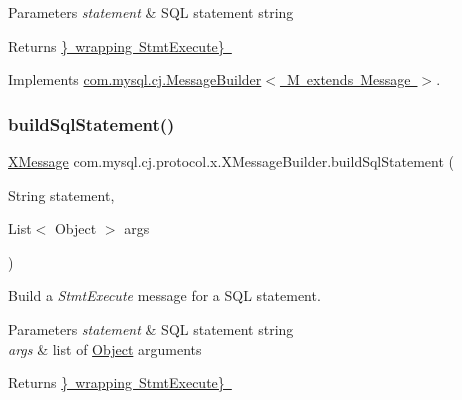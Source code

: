 \begin{DoxyParams}{Parameters}
{\em statement} & S\+QL statement string \\
\hline
\end{DoxyParams}
\begin{DoxyReturn}{Returns}
\mbox{\hyperlink{classcom_1_1mysql_1_1cj_1_1protocol_1_1x_1_1_x_message}{\} wrapping  Stmt\+Execute\} }}
\end{DoxyReturn}


Implements \mbox{\hyperlink{interfacecom_1_1mysql_1_1cj_1_1_message_builder_ab18c136ad40edd22c321cae8c222e6ad}{com.\+mysql.\+cj.\+Message\+Builder$<$ M extends Message $>$}}.

\mbox{\label{classcom_1_1mysql_1_1cj_1_1protocol_1_1x_1_1_x_message_builder_a2c3993eeb6a20211b7a81f15784fb537}} 
\subsubsection{\texorpdfstring{build\+Sql\+Statement()}{buildSqlStatement()}\hspace{0.1cm}{\footnotesize\ttfamily [2/2]}}
{\footnotesize\ttfamily \mbox{\hyperlink{classcom_1_1mysql_1_1cj_1_1protocol_1_1x_1_1_x_message}{X\+Message}} com.\+mysql.\+cj.\+protocol.\+x.\+X\+Message\+Builder.\+build\+Sql\+Statement (\begin{DoxyParamCaption}\item[{String}]{statement,  }\item[{List$<$ Object $>$}]{args }\end{DoxyParamCaption})}

Build a {\itshape Stmt\+Execute} message for a S\+QL statement.


\begin{DoxyParams}{Parameters}
{\em statement} & S\+QL statement string \\
\hline
{\em args} & list of \mbox{\hyperlink{}{Object}} arguments \\
\hline
\end{DoxyParams}
\begin{DoxyReturn}{Returns}
\mbox{\hyperlink{classcom_1_1mysql_1_1cj_1_1protocol_1_1x_1_1_x_message}{\} wrapping  Stmt\+Execute\} }}
\end{DoxyReturn}


